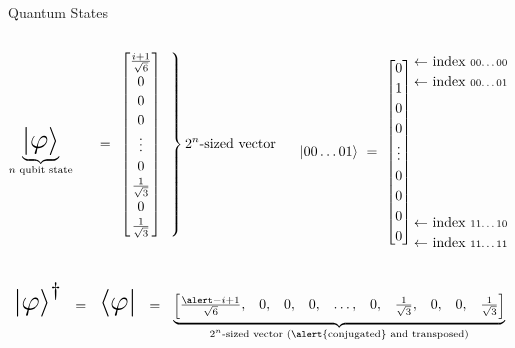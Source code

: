 \begin{frame}{Quantum States}



\begin{columns}%
	\begin{column}{.4\textwidth}
\[
\def\arraystretch{1.15}
\underbrace{\scalebox{2}{$\ket{\phi}$}}_{n \text{ qubit state}}
~~~~~=~
\left.
\begin{bmatrix*}[c]
    \frac{i+1}{\sqrt 6} \\ 0 \\ 0 \\ 0\\ \vdots \\0\\ \frac1{\sqrt 3} \\ 0 \\\frac1{\sqrt 3} 
\end{bmatrix*}
~~\right \}\text{$2^n$-sized vector}
\]  
	\end{column}
	\begin{column}{.6\textwidth}
\vspace{3mm}\[
\def\arraystretch{1.2}
\scalebox{1.}{$\ket{00\dots01}$}
~=~
\begin{bmatrix*}[c]
    0 \\ 1 \\ 0 \\ 0\\ \vdots \\0\\ 0  \\ 0 \\ 0 
\end{bmatrix*}
\begin{matrix*}[c]
	{\text{$\leftarrow$ index \scriptsize 00\dots00 }} \\ 
	{\text{$\leftarrow$ index \scriptsize 00\dots01 }} \\ \\ \\ \\ \\ \\ \\  
	{\text{$\leftarrow$ index \scriptsize 11\dots10 }} \\  
	{\text{$\leftarrow$ index \scriptsize 11\dots11 }} \\ 
\end{matrix*}
\]  	
	\end{column}
\end{columns}
\pause
\begin{columns}%
	\begin{column}{1\textwidth}
\[
\def\arraystretch{.9}
\scalebox{2}{$\ket{\phi}^\dagger$}
~~=~~
\scalebox{2}{$\bra{\phi}$}
~~=~~
\underbrace{
\begin{bmatrix*}[c]
    \frac{\alert -i+1}{\sqrt 6} ,& 0 ,& 0 ,& 0,& \dots ,&0,&  \frac1{\sqrt 3} ,& 0 ,& 0 ,& \frac1{\sqrt 3} 
\end{bmatrix*}
}_{\text{$2^n$-sized vector (\alert{conjugated} and transposed)}}
\]  
	\end{column}
\end{columns}


\end{frame}

